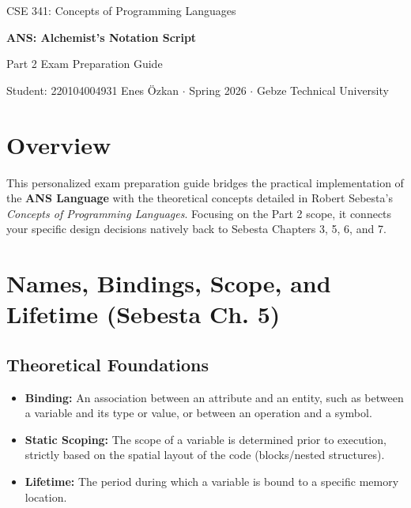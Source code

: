 \documentclass[11pt,a4paper]{article}
\begin{document}
\begin{center}
  {\footnotesize\color{anscaption}CSE 341: Concepts of Programming Languages\par}
  \vspace{3pt}
  {\Large\bfseries\sffamily ANS: Alchemist's Notation Script\par}
  \vspace{3pt}
  {\large Part 2 Exam Preparation Guide\par}
  \vspace{6pt}
  {\footnotesize\color{anscaption}
    Student: 220104004931 Enes Özkan \(\cdot\) Spring 2026 \(\cdot\) Gebze Technical University\par}
\end{center}
\vspace{10pt}

\section*{Overview}
This personalized exam preparation guide bridges the practical implementation of the \textbf{ANS Language} with the theoretical concepts detailed in Robert Sebesta's \textit{Concepts of Programming Languages}. 
Focusing on the Part 2 scope, it connects your specific design decisions natively back to Sebesta Chapters 3, 5, 6, and 7.

\section{Names, Bindings, Scope, and Lifetime (Sebesta Ch. 5)}
\subsection*{Theoretical Foundations}
\begin{itemize}
    \item \textbf{Binding:} An association between an attribute and an entity, such as between a variable and its type or value, or between an operation and a symbol.
    \item \textbf{Static Scoping:} The scope of a variable is determined prior to execution, strictly based on the spatial layout of the code (blocks/nested structures).
    \item \textbf{Lifetime:} The period during which a variable is bound to a specific memory location.
\end{itemize}
\end{document}
